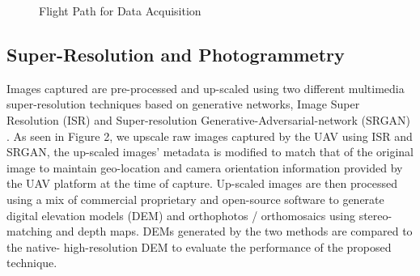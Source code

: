 \documentclass[conference]{IEEEtran}
\begin{document}
\begin{figure}[htbp]
    \caption{Flight Path for Data Acquisition}
    \label{fig3}
\end{figure}



\subsection{Super-Resolution and Photogrammetry}
Images captured are pre-processed and up-scaled using two
different multimedia super-resolution techniques based on
generative networks, Image Super Resolution (ISR) \cite{cardinale2018isr} and
Super-resolution Generative-Adversarial-network (SRGAN)
\cite{fastsrgan}. As seen in Figure 2, we upscale raw images captured
by the UAV using ISR and SRGAN, the up-scaled images'
metadata is modified to match that of the original image to
maintain geo-location and camera orientation information
provided by the UAV platform at the time of capture.
Up-scaled images are then processed using a mix of
commercial proprietary and open-source software to
generate digital elevation models (DEM) and orthophotos /
orthomosaics using stereo-matching and depth maps. DEMs
generated by the two methods are compared to the native-
high-resolution DEM to evaluate the performance of the
proposed technique.
\end{document}
